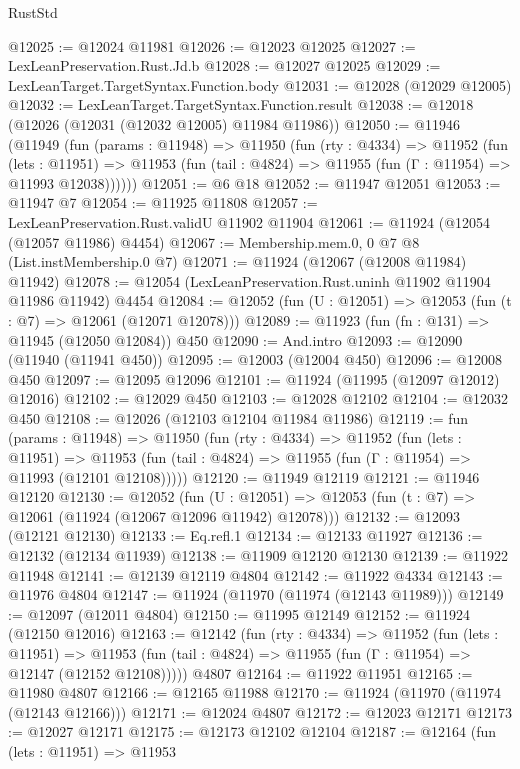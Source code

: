 \begin{lexlean}{RustStd}
\begin{coremodule}
{\begin{coremodule}
{{{{{{{{{{{{{{{{{{{{{{{{{{{{{{{{{{{{{{{{{{{{{{{{{{{{{{{{{{{{{{{{{{{{{{{{{{{{{{{{@12025 := @12024 @11981
@12026 := @12023 @12025
@12027 := LexLeanPreservation.Rust.Jd.b
@12028 := @12027 @12025
@12029 := LexLeanTarget.TargetSyntax.Function.body
@12031 := @12028 (@12029 @12005)
@12032 := LexLeanTarget.TargetSyntax.Function.result
@12038 := @12018 (@12026 (@12031 (@12032 @12005) @11984 @11986))
@12050 := @11946
    (@11949
      (fun (params : @11948) =>
      @11950
        (fun (rty : @4334) =>
        @11952
          (fun (lets : @11951) =>
          @11953 (fun (tail : @4824) => @11955 (fun (Γ : @11954) => @11993 @12038))))))
@12051 := @6 @18
@12052 := @11947 @12051
@12053 := @11947 @7
@12054 := @11925 @11808
@12057 := LexLeanPreservation.Rust.validU @11902 @11904
@12061 := @11924 (@12054 (@12057 @11986) @4454)
@12067 := Membership.mem.{0, 0} @7 @8 (List.instMembership.{0} @7)
@12071 := @11924 (@12067 (@12008 @11984) @11942)
@12078 := @12054 (LexLeanPreservation.Rust.uninh @11902 @11904 @11986 @11942) @4454
@12084 := @12052 (fun (U : @12051) => @12053 (fun (t : @7) => @12061 (@12071 @12078)))
@12089 := @11923 (fun (fn : @131) => @11945 (@12050 @12084)) @450
@12090 := And.intro
@12093 := @12090 (@11940 (@11941 @450))
@12095 := @12003 (@12004 @450)
@12096 := @12008 @450
@12097 := @12095 @12096
@12101 := @11924 (@11995 (@12097 @12012) @12016)
@12102 := @12029 @450
@12103 := @12028 @12102
@12104 := @12032 @450
@12108 := @12026 (@12103 @12104 @11984 @11986)
@12119 := fun (params : @11948) =>
  @11950
    (fun (rty : @4334) =>
    @11952
      (fun (lets : @11951) =>
      @11953 (fun (tail : @4824) => @11955 (fun (Γ : @11954) => @11993 (@12101 @12108)))))
@12120 := @11949 @12119
@12121 := @11946 @12120
@12130 := @12052
    (fun (U : @12051) => @12053 (fun (t : @7) => @12061 (@11924 (@12067 @12096 @11942) @12078)))
@12132 := @12093 (@12121 @12130)
@12133 := Eq.refl.{1}
@12134 := @12133 @11927
@12136 := @12132 (@12134 @11939)
@12138 := @11909 @12120 @12130
@12139 := @11922 @11948
@12141 := @12139 @12119 @4804
@12142 := @11922 @4334
@12143 := @11976 @4804
@12147 := @11924 (@11970 (@11974 (@12143 @11989)))
@12149 := @12097 (@12011 @4804)
@12150 := @11995 @12149
@12152 := @11924 (@12150 @12016)
@12163 := @12142
    (fun (rty : @4334) =>
    @11952
      (fun (lets : @11951) =>
      @11953 (fun (tail : @4824) => @11955 (fun (Γ : @11954) => @12147 (@12152 @12108)))))
    @4807
@12164 := @11922 @11951
@12165 := @11980 @4807
@12166 := @12165 @11988
@12170 := @11924 (@11970 (@11974 (@12143 @12166)))
@12171 := @12024 @4807
@12172 := @12023 @12171
@12173 := @12027 @12171
@12175 := @12173 @12102 @12104
@12187 := @12164
    (fun (lets : @11951) =>
    @11953
}}}}}}}}}}}}}}}}}}}}}}}}}}}}}}}}}}}}}}}}}}}}}}}}}}}}}}}}}}}}}}}}}}}}}}}}}}}}}}}}
\end{coremodule}}
\end{coremodule}
\end{lexlean}
